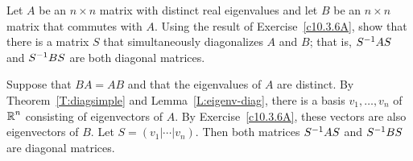 \documentclass{ximera}
\begin{document}
\begin{exercise} \label{c10.3.6B}
Let $A$ be an $n\times n$ matrix with distinct real eigenvalues and let $B$ 
be an $n\times n$ matrix that commutes with $A$.  Using the result of
Exercise~\ref{c10.3.6A}, show that there is a matrix $S$ that simultaneously
diagonalizes $A$ and $B$; that is, $S^{-1} AS$ and $S^{-1} BS$ are both
diagonal matrices.

\begin{solution}
Suppose that $BA=AB$ and that the eigenvalues of $A$ are distinct. 
By Theorem~\ref{T:diagsimple} and Lemma~\ref{L:eigenv-diag}, 
there is a basis $v_1,\ldots,v_n$ of $\mbox{$\Bbb{R}$}^n$ consisting of eigenvectors of $A$.  By 
Exercise~\ref{c10.3.6A}, these vectors are also eigenvectors of $B$.  Let 
$S=(v_1|\cdots|v_n)$.  Then both matrices $S^{-1} AS$ and $S^{-1} BS$ are diagonal 
matrices.

\end{solution}
\end{exercise}
\end{document}
